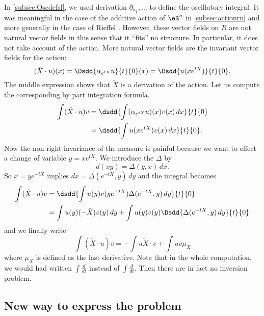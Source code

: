 In \ref{subsec:Oscdefsl}, we used derivation $\partial_{a_1},\ldots$ to define the oscillatory integral. It was meaningful in the case of the additive action of $\eR^n$ in \ref{subsec:actionrn} and more generally in the case of Rieffel \cite{Rieffel}. However, these vector fields on $R$ are not natural vector fields in this sense that it ``fits'' no structure. In particular, it does not take account of the action. More natural vector fields are the invariant vector fields for the action:
\begin{equation} 
   (\tilde X\cdot u)(x)=\Dsdd{ \alpha_{e^{tX}}u }{t}{0}(x)=\Dsdd{ u(xe^{tX}) }{t}{0}.
\end{equation}
The middle expression shows that $\tilde X$ is a derivation of the action. Let us compute the corresponding by part integration formula.
\begin{equation}
\begin{split}
\int (\tilde X\cdot u)v&=\dsdd{\int (\alpha_{e^{tX}}u)(x)v(x)\,dx }{t}{0}\\
		&=\dsdd{ \int u(xe^{tX})v(x)\,dx }{t}{0}.
\end{split}
\end{equation}
Now the non right invariance of the measure is painful because we want to effect a change of variable $y=xe^{tX}$. We introduce the  $\Delta$ by
\begin{equation}
  d(xg)=\Delta(g,x)\,dx.
\end{equation}
So $x=ye^{-tX}$ implies $dx=\Delta(e^{-tX},y)\,dy$ and the integral becomes
\begin{equation} \label{eq:euler}
\begin{split}
\int (\tilde X\cdot u)v&=\dsdd{ \int u(y)v(ye^{-tX})\Delta(e^{-tX},y)\,dy }{t}{0}\\
		&=\int u(y)(-\tilde X)v(y)\,dy+\int u(y) v(y)\Dsdd{ \Delta(e^{-tX},y)\,dy }{t}{0}
\end{split}
\end{equation}
and we finally write
\begin{equation}
\int (\tilde X\cdot u)v=-\int u\tilde X\cdot v+\int uv\mu_X
\end{equation}
where $\mu_X$ is defined as the last derivative. Note that in the whole computation, we would had written $\int\frac{d}{dt}$ instead of $\int\frac{d}{dt}$. Then there are in fact no inversion problem.


\subsection{New way to express the problem}

